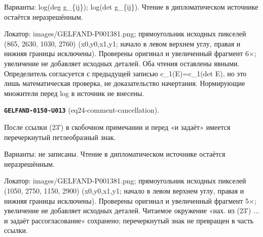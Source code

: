\documentclass[11pt]{article}
\theoremstyle{definition}
\theoremstyle{remark}
\begin{document}
Варианты: log(deg g\_\{ij\}); log(det g\_\{ij\}). Чтение в дипломатическом источнике остаётся неразрешённым.\par
Локатор: images/GELFAND-P001381.png; прямоугольник исходных пикселей (865, 2630, 1030, 2760) (x0,y0,x1,y1; начало в левом верхнем углу, правая и нижняя границы исключены). Проверены оригинал и увеличенный фрагмент 6×; увеличение не добавляет исходных деталей. Оба чтения оставлены явными. Определитель согласуется с предыдущей записью c\_1(E)=c\_1(det E), но это лишь математическая проверка, не доказательство начертания. Нормирующие множители перед log в источник не внесены.\par\medskip
\noindent\leavevmode{}\label{GELFAND-P001381:eq24-comment-cancellation:note}\textbf{\texttt{GELFAND-0150-U013}} (eq24-comment-cancellation).\par\nopagebreak[4]
После ссылки (23′) в скобочном примечании и перед «и задаёт» имеется перечеркнутый петлеобразный знак.\par
Варианты: не записаны. Чтение в дипломатическом источнике остаётся неразрешённым.\par
Локатор: images/GELFAND-P001381.png; прямоугольник исходных пикселей (1050, 2750, 1150, 2900) (x0,y0,x1,y1; начало в левом верхнем углу, правая и нижняя границы исключены). Проверены оригинал и увеличенный фрагмент 5×; увеличение не добавляет исходных деталей. Читаемое окружение «нах. из (23′) ... и задаёт рассогласование» сохранено; перечеркнутый знак не превращен в часть ссылки.\par\medskip
\end{document}
